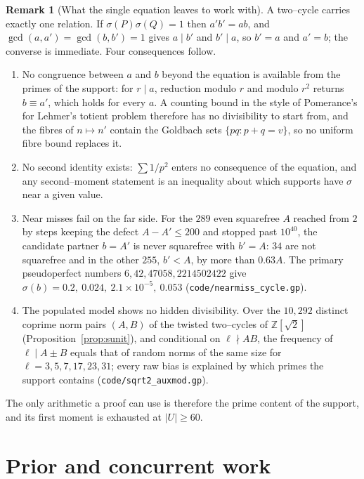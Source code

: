 \documentclass[11pt]{article}
\theoremstyle{definition}
\newtheorem{remark}[theorem]{Remark}
\begin{document}
\begin{remark}[What the single equation leaves to work with]\label{rem:closedroutes}
A two--cycle carries exactly one relation. If $\sigma(P)\sigma(Q)=1$ then $a'b'=ab$, and
$\gcd(a,a')=\gcd(b,b')=1$ gives $a\mid b'$ and $b'\mid a$, so $b'=a$ and $a'=b$; the converse is
immediate. Four consequences follow.
\begin{enumerate}
\item No congruence between $a$ and $b$ beyond the equation is available from the primes of the support:
for $r\mid a$, reduction modulo $r$ and modulo $r^{2}$ returns $b\equiv a'$, which holds for every $a$.
A counting bound in the style of Pomerance's for Lehmer's totient problem therefore has no divisibility to
start from, and the fibres of $n\mapsto n'$ contain the Goldbach sets $\{pq:p+q=v\}$, so no uniform fibre
bound replaces it.
\item No second identity exists: $\sum1/p^{2}$ enters no consequence of the equation, and any
second--moment statement is an inequality about which supports have $\sigma$ near a given value.
\item Near misses fail on the far side. For the $289$ even squarefree $A$ reached from $2$ by steps
keeping the defect $A-A'\le200$ and stopped past $10^{40}$, the candidate partner $b=A'$ is never squarefree with $b'=A$: $34$
are not squarefree and in the other $255$, $b'<A$, by more than $0.63A$. The primary pseudoperfect numbers
$6,42,47058,2214502422$ give $\sigma(b)=0.2,\ 0.024,\ 2.1\times10^{-5},\ 0.053$
\textup{(\texttt{code/nearmiss\_cycle.gp})}.
\item The populated model shows no hidden divisibility. Over the $10{,}292$ distinct coprime norm pairs
$(A,B)$ of the twisted two--cycles of $\mathbb{Z}[\sqrt2]$ (Proposition~\ref{prop:sunit}), and conditional on
$\ell\nmid AB$, the frequency of $\ell\mid A\pm B$ equals that of random norms of the same size for
$\ell=3,5,7,17,23,31$; every raw bias is explained by which primes the support contains
\textup{(\texttt{code/sqrt2\_auxmod.gp})}.
\end{enumerate}
The only arithmetic a proof can use is therefore the prime content of the support, and its first moment
is exhausted at $|U|\ge60$.
\end{remark}

\section{Prior and concurrent work}\label{sec:prior}
\end{document}
